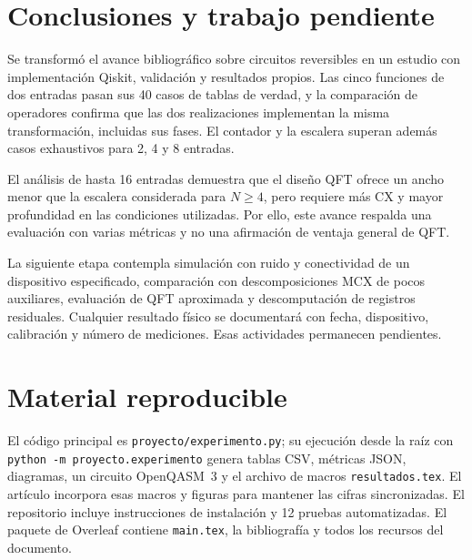 \documentclass[10pt,a4paper,twocolumn]{article}
\begin{document}
\section{Conclusiones y trabajo pendiente}
Se transformó el avance bibliográfico sobre circuitos reversibles en un
estudio con implementación Qiskit, validación y resultados propios.
Las cinco funciones de dos entradas pasan sus 40 casos de tablas de verdad,
y la comparación de operadores confirma que las dos realizaciones implementan
la misma transformación, incluidas sus fases. El contador y la escalera
superan además \ValidationCases{} casos exhaustivos para 2, 4 y 8 entradas.

El análisis de hasta 16 entradas demuestra que el diseño QFT ofrece un ancho
menor que la escalera considerada para $N\geq4$, pero requiere más CX y mayor profundidad
en las condiciones utilizadas. Por ello, este avance respalda una evaluación
con varias métricas y no una afirmación de ventaja general de QFT.

La siguiente etapa contempla simulación con ruido y conectividad de un
dispositivo especificado, comparación con descomposiciones MCX de pocos
auxiliares, evaluación de QFT aproximada y descomputación de registros
residuales. Cualquier resultado físico se documentará con fecha, dispositivo,
calibración y número de mediciones. Esas actividades permanecen pendientes.

\section{Material reproducible}
El código principal es \texttt{proyecto/experimento.py}; su ejecución desde
la raíz con \texttt{python -m proyecto.experimento} genera tablas CSV,
métricas JSON, diagramas, un circuito OpenQASM~3 y el archivo de macros
\texttt{resultados.tex}. El artículo incorpora esas macros y figuras para
mantener las cifras sincronizadas. El repositorio incluye instrucciones de
instalación y 12 pruebas automatizadas. El paquete de Overleaf contiene
\texttt{main.tex}, la bibliografía y todos los recursos del documento.

\clearpage


\end{document}
